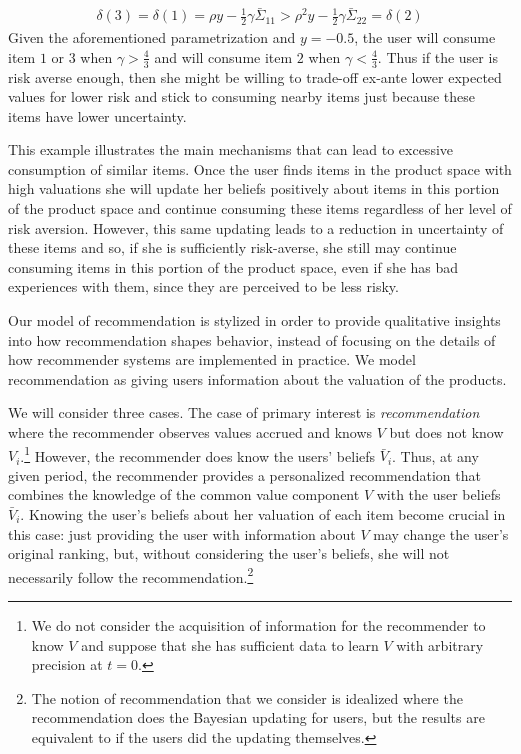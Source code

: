 \documentclass[format=acmsmall, review=false]{acmart}
\newcommand{\xhdr}[1]{\vspace{1mm} \noindent{\bf #1}}
\begin{document}
\begin{align*}
\delta(3) = \delta(1) = \rho y - \frac{1}{2} \gamma \bar{\Sigma}_{11} > \rho^{2} y - \frac{1}{2} \gamma \bar{\Sigma}_{22} = \delta(2)
\end{align*}
Given the aforementioned parametrization and $y = -0.5$, the user will consume item $1$ or $3$ when $\gamma > \frac{4}{3}$ and will consume item $2$ when $\gamma < \frac{4}{3}$. Thus if the user is risk averse enough, then she might be willing to trade-off ex-ante lower expected values for lower risk and stick to consuming nearby items just because these items have lower uncertainty. 
\par 
This example illustrates the main mechanisms that can lead to excessive consumption of similar items. Once the user finds items in the product space with high valuations she will update her beliefs positively about items in this portion of the product space and continue consuming these items regardless of her level of risk aversion. However, this same updating leads to a reduction in uncertainty of these items and so, if she is sufficiently risk-averse, she still may continue consuming items in this portion of the product space, even if she has bad experiences with them, since they are perceived to be less risky. 
\par

\xhdr{Recommendation.}
Our model of recommendation is stylized in order to provide qualitative insights into how recommendation shapes behavior, instead of focusing on the details of how recommender systems are implemented in practice. We model recommendation as giving users information about the valuation of the products.
\par

We will consider three cases. The case of primary interest is \textit{recommendation} where the recommender observes values accrued and knows $V$ but does not know $V_i$.\footnote{We do not consider the acquisition of information for the recommender to know $V$ and suppose that she has sufficient data to learn $V$ with arbitrary precision at $t = 0$.} However, the recommender does know the users' beliefs $\bar V_i$. Thus, at any given period, the recommender provides a personalized recommendation that combines the knowledge of the common value component $V$ with the user beliefs $\bar V_i$. Knowing the user's beliefs about her valuation of each item become crucial in this case: just providing the user with information about $V$ may change the user's original ranking, but, without considering the user's beliefs, she will not necessarily follow the recommendation.\footnote{The notion of recommendation that we consider is idealized where the recommendation does the Bayesian updating for users, but the results are equivalent to if the users did the updating themselves.}
\par
\end{document}
